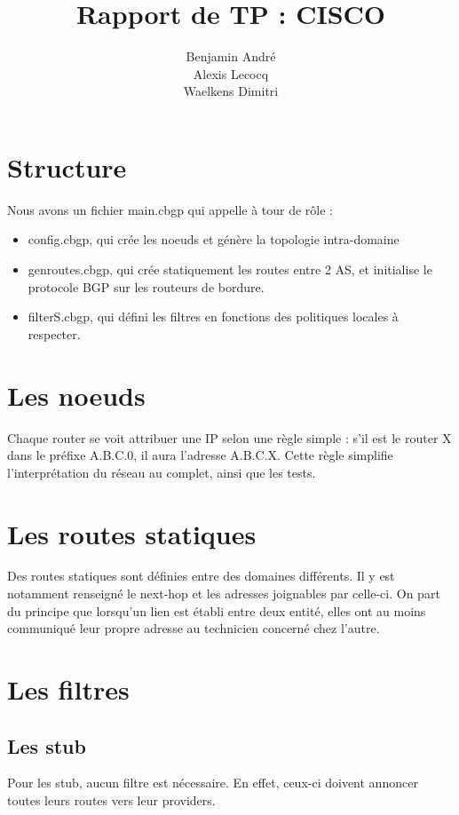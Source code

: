 \documentclass{article}
\author{Benjamin André\\Alexis Lecocq\\Waelkens Dimitri}
\title{Rapport de TP : CISCO}
\begin{document}
\maketitle

\section{Structure}
Nous avons un fichier main.cbgp qui appelle à tour de rôle :
\begin{itemize}
	\item config.cbgp, qui crée les noeuds et génère la topologie intra-domaine
	\item genroutes.cbgp, qui crée statiquement les routes entre 2 AS, et initialise le protocole BGP sur les routeurs de bordure.
	\item filterS.cbgp, qui défini les filtres en fonctions des politiques locales à respecter. 
\end{itemize}

\section{Les noeuds}

Chaque router se voit attribuer une IP selon une règle simple : s'il est le router X dans le préfixe A.B.C.0, il aura l'adresse A.B.C.X. Cette règle simplifie l'interprétation du réseau au complet, ainsi que les tests.

\section{Les routes statiques}

Des routes statiques sont définies entre des domaines différents. Il y est notamment renseigné le next-hop et les adresses joignables par celle-ci. On part du principe que lorsqu'un lien est établi entre deux entité, elles ont au moins communiqué leur propre adresse au technicien concerné chez l'autre.



\section{Les filtres}

\subsection{Les stub}
Pour les stub, aucun filtre est nécessaire. En effet, ceux-ci doivent annoncer toutes leurs routes vers leur providers.
\end{document}
